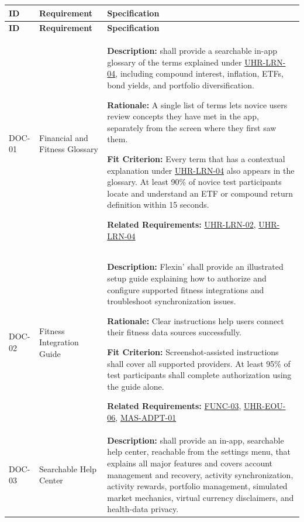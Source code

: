 \documentclass[12pt]{article}
\begin{document}
\small
\setlength{\tabcolsep}{4pt}
\begin{xltabular}{\textwidth}{|p{2.6cm}|p{3.4cm}|X|}
\hline
\textbf{ID} & \textbf{Requirement} & \textbf{Specification} \\
\hline
\endfirsthead
\hline
\textbf{ID} & \textbf{Requirement} & \textbf{Specification} \\
\hline
\endhead

DOC-01\hypertarget{req:DOC-01}{} &
Financial and Fitness Glossary &
\textbf{Description:} \progname{} shall provide a searchable in-app glossary of the terms explained under \hyperlink{req:UHR-LRN-04}{UHR-LRN-04}, including compound interest, inflation, ETFs, bond yields, and portfolio diversification.

\textbf{Rationale:} A single list of terms lets novice users review concepts they have met in the app, separately from the screen where they first saw them.

\textbf{Fit Criterion:} Every term that has a contextual explanation under \hyperlink{req:UHR-LRN-04}{UHR-LRN-04} also appears in the glossary. At least 90\% of novice test participants locate and understand an ETF or compound return definition within 15 seconds.

\textbf{Related Requirements:} \hyperlink{req:UHR-LRN-02}{UHR-LRN-02}, \hyperlink{req:UHR-LRN-04}{UHR-LRN-04}\\
\hline

DOC-02\hypertarget{req:DOC-02}{} &
Fitness Integration Guide &
\textbf{Description:} Flexin' shall provide an illustrated setup guide explaining how to authorize and configure supported fitness integrations and troubleshoot synchronization issues.

\textbf{Rationale:} Clear instructions help users connect their fitness data sources successfully.

\textbf{Fit Criterion:} Screenshot-assisted instructions shall cover all supported providers. At least 95\% of test participants shall complete authorization using the guide alone.

\textbf{Related Requirements:} \hyperlink{req:FUNC-03}{FUNC-03}, \hyperlink{req:UHR-EOU-06}{UHR-EOU-06}, \hyperlink{req:MAS-ADPT-01}{MAS-ADPT-01}\\
\hline

DOC-03\hypertarget{req:DOC-03}{} &
Searchable Help Center &
\textbf{Description:} \progname{} shall provide an in-app, searchable help center, reachable from the settings menu, that explains all major features and covers account management and recovery, activity synchronization, activity rewards, portfolio management, simulated market mechanics, virtual currency disclaimers, and health-data privacy.


\end{xltabular}
\end{document}
